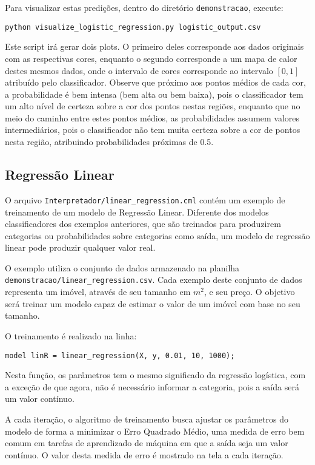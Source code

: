 \documentclass[12pt]{article}
\begin{document}
Para visualizar estas predições, dentro do diretório \texttt{demonstracao}, execute:

\begin{verbatim}
python visualize_logistic_regression.py logistic_output.csv
\end{verbatim}

Este script irá gerar dois plots. O primeiro deles corresponde aos dados originais com as respectivas cores, enquanto o segundo corresponde a um mapa de calor destes mesmos dados, onde o intervalo de cores corresponde ao intervalo $[0,1]$ atribuído pelo classificador. Observe que próximo aos pontos médios de cada cor, a probabilidade é bem intensa (bem alta ou bem baixa), pois o classificador tem um alto nível de certeza sobre a cor dos pontos nestas regiões, enquanto que no meio do caminho entre estes pontos médios, as probabilidades assumem valores intermediários, pois o classificador não tem muita certeza sobre a cor de pontos nesta região, atribuindo probabilidades próximas de 0.5.

\subsection{Regressão Linear}

O arquivo \texttt{Interpretador/linear\_regression.cml} contém um exemplo de treinamento de um modelo de Regressão Linear. Diferente dos modelos classificadores dos exemplos anteriores, que são treinados para produzirem categorias ou probabilidades sobre categorias como saída, um modelo de regressão linear pode produzir qualquer valor real.

O exemplo utiliza o conjunto de dados armazenado na planilha \\ \texttt{demonstracao/linear\_regression.csv}. Cada exemplo deste conjunto de dados representa um imóvel, através de seu tamanho em $m^2$, e seu preço. O objetivo será treinar um modelo capaz de estimar o valor de um imóvel com base no seu tamanho.

O treinamento é realizado na linha:

\begin{verbatim}
model linR = linear_regression(X, y, 0.01, 10, 1000);
\end{verbatim}

Nesta função, os parâmetros tem o mesmo significado da regressão logística, com a exceção de que agora, não é necessário informar a categoria, pois a saída será um valor contínuo.

A cada iteração, o algoritmo de treinamento busca ajustar os parâmetros do modelo de forma a minimizar o Erro Quadrado Médio, uma medida de erro bem comum em tarefas de aprendizado de máquina em que a saída seja um valor contínuo. O valor desta medida de erro é mostrado na tela a cada iteração.
\end{document}
